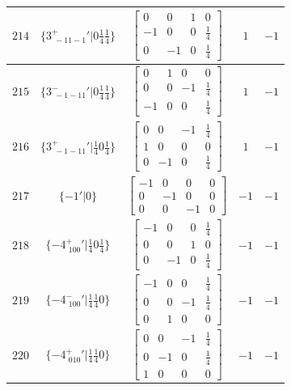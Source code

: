 \documentclass[fleqn,8pt]{jsarticle}
\begin{document}
\begin{longtable}{ccccc}
$ 214 $ & $ \{3^{+}_{\,\,-11-1}{}'|0 \frac{1}{4} \frac{1}{4}\} $ & $ \begin{bmatrix} 0 & 0 & 1 & 0 \\ -1 & 0 & 0 & \frac{1}{4} \\ 0 & -1 & 0 & \frac{1}{4} \end{bmatrix} $ & $ 1 $ & $ -1 $ \\ \hline
$ 215 $ & $ \{3^{-}_{\,\,-1-11}{}'|0 \frac{1}{4} \frac{1}{4}\} $ & $ \begin{bmatrix} 0 & 1 & 0 & 0 \\ 0 & 0 & -1 & \frac{1}{4} \\ -1 & 0 & 0 & \frac{1}{4} \end{bmatrix} $ & $ 1 $ & $ -1 $ \\ \hline
$ 216 $ & $ \{3^{+}_{\,\,-1-11}{}'|\frac{1}{4} 0 \frac{1}{4}\} $ & $ \begin{bmatrix} 0 & 0 & -1 & \frac{1}{4} \\ 1 & 0 & 0 & 0 \\ 0 & -1 & 0 & \frac{1}{4} \end{bmatrix} $ & $ 1 $ & $ -1 $ \\ \hline
$ 217 $ & $ \{-1{}'|0\} $ & $ \begin{bmatrix} -1 & 0 & 0 & 0 \\ 0 & -1 & 0 & 0 \\ 0 & 0 & -1 & 0 \end{bmatrix} $ & $ -1 $ & $ -1 $ \\ \hline
$ 218 $ & $ \{-4^{+}_{\,\,100}{}'|\frac{1}{4} 0 \frac{1}{4}\} $ & $ \begin{bmatrix} -1 & 0 & 0 & \frac{1}{4} \\ 0 & 0 & 1 & 0 \\ 0 & -1 & 0 & \frac{1}{4} \end{bmatrix} $ & $ -1 $ & $ -1 $ \\ \hline
$ 219 $ & $ \{-4^{-}_{\,\,100}{}'|\frac{1}{4} \frac{1}{4} 0\} $ & $ \begin{bmatrix} -1 & 0 & 0 & \frac{1}{4} \\ 0 & 0 & -1 & \frac{1}{4} \\ 0 & 1 & 0 & 0 \end{bmatrix} $ & $ -1 $ & $ -1 $ \\ \hline
$ 220 $ & $ \{-4^{+}_{\,\,010}{}'|\frac{1}{4} \frac{1}{4} 0\} $ & $ \begin{bmatrix} 0 & 0 & -1 & \frac{1}{4} \\ 0 & -1 & 0 & \frac{1}{4} \\ 1 & 0 & 0 & 0 \end{bmatrix} $ & $ -1 $ & $ -1 $ \\ \hline

\end{longtable}
\end{document}
